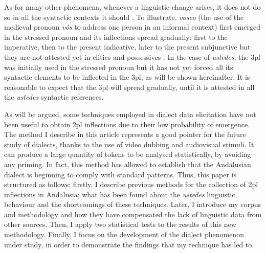 \documentclass[output=paper]{LSP/langsci}
\begin{document}
\begin{table}
\label{tab:3}
\caption{Allocutives person agreements in Andalusia} 
\end{table}

As for many other phenomena, whenever a linguistic change arises, it does not do so in all the syntactic contexts it should \citep{labov_principles_1995,corbett_agreement_2006}. To illustrate, \textit{voseo} (the use of the medieval pronoun \textit{vós} to address one person in an informal context) first emerged in the stressed pronoun and its inflections spread gradually: first to the imperative, then to the present indicative, later to the present subjunctive but they are not attested yet in clitics and possessives \citep{fontanella_de_weinberg_oposicion_1979,abadia_de_quant_relacion_1992,bertolotti_synchronical_2003}. In the case of \textit{ustedes}, the 3pl was initially used in the stressed pronoun but it has not yet forced all its syntactic elements to be inflected in the 3pl, as will be shown hereinafter. It is reasonable to expect that the 3pl will spread gradually, until it is attested in all the \textit{ustedes} syntactic references.

As will be argued, some techniques employed in dialect data elicitation have not been useful to obtain 2pl inflections due to their low probability of emergence. The method I describe in this article represents a good pointer for the future study of dialects, thanks to the use of video dubbing and audiovisual stimuli. It can produce a large quantity of tokens to be analysed statistically, by avoiding any priming. In fact, this method has allowed to establish that the Andalusian dialect is beginning to comply with standard patterns. Thus, this paper is structured as follows: firstly, I describe previous methods for the collection of 2pl inflections in Andalusia; what has been found about the \textit{ustedes} linguistic behaviour and the shortcomings of these techniques. Later, I introduce my corpus and methodology and how they have compensated the lack of linguistic data from other sources. Then, I apply two statistical tests to the results of this new methodology. Finally, I focus on the development of the dialect phenomenon under study, in order to demonstrate the findings that my technique has led to.
\end{document}
